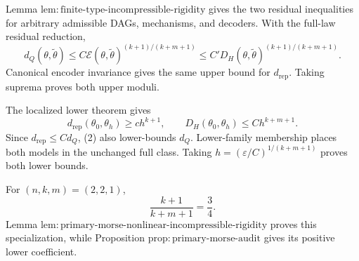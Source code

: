 Lemma \(\mathrm{lem:finite\text{-}type\text{-}incompressible\text{-}rigidity}\) gives the two residual inequalities for arbitrary admissible DAGs, mechanisms, and decoders.  With the full-law residual reduction,
\[
 d_Q(\theta,\widetilde\theta)
 \leq C\mathcal E(\theta,\widetilde\theta)^{(k+1)/(k+m+1)}
 \leq C'D_H(\theta,\widetilde\theta)^{(k+1)/(k+m+1)}.
\tag{1}
\]
Canonical encoder invariance gives the same upper bound for \(d_{\mathrm{rep}}\).  Taking suprema proves both upper moduli.

The localized lower theorem gives
\[
 d_{\mathrm{rep}}(\theta_0,\theta_h)\geq c h^{k+1},
 \qquad D_H(\theta_0,\theta_h)\leq C h^{k+m+1}.
\tag{2}
\]
Since \(d_{\mathrm{rep}}\leq C d_Q\), (2) also lower-bounds \(d_Q\).  Lower-family membership places both models in the unchanged full class.  Taking \(h=(\varepsilon/C)^{1/(k+m+1)}\) proves both lower bounds.

For \((n,k,m)=(2,2,1)\),
\[
 \frac{k+1}{k+m+1}=\frac34.
\]
Lemma \(\mathrm{lem:primary\text{-}morse\text{-}nonlinear\text{-}incompressible\text{-}rigidity}\) proves this specialization, while Proposition \(\mathrm{prop:primary\text{-}morse\text{-}audit}\) gives its positive lower coefficient.
